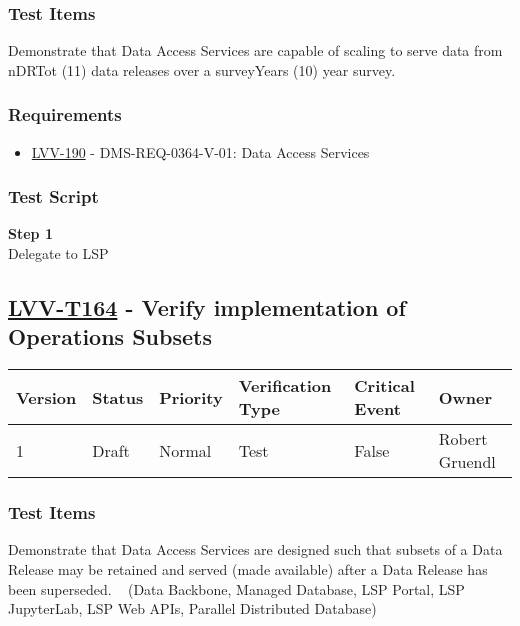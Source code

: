 \subsubsection{Test Items}\label{test-items-29}

Demonstrate that Data Access Services are capable of scaling to serve
data from nDRTot (11) data releases over a surveyYears (10) year survey.

\subsubsection{Requirements}\label{requirements-29}

\begin{itemize}
\tightlist
\item
  \href{https://jira.lsstcorp.org/browse/LVV-190}{LVV-190} -
  DMS-REQ-0364-V-01: Data Access Services
\end{itemize}

\subsubsection{Test Script}\label{test-script-29}

\textbf{Step 1}\\
Delegate to LSP\\[2\baselineskip]

\hypertarget{lvv-t164---verify-implementation-of-operations-subsets}{\subsection{\texorpdfstring{\href{https://jira.lsstcorp.org/secure/Tests.jspa\#/testCase/LVV-T164}{LVV-T164}
- Verify implementation of Operations
Subsets}{LVV-T164 - Verify implementation of Operations Subsets}}\label{lvv-t164---verify-implementation-of-operations-subsets}}

\begin{longtable}[]{@{}llllll@{}}
\toprule
Version & Status & Priority & Verification Type & Critical Event &
Owner\tabularnewline
\midrule
\endhead
1 & Draft & Normal & Test & False & Robert Gruendl\tabularnewline
\bottomrule
\end{longtable}

\subsubsection{Test Items}\label{test-items-30}

Demonstrate that Data Access Services are designed such that subsets of
a Data Release may be retained and served (made available) after a Data
Release has been superseded. ~ (Data Backbone, Managed Database, LSP
Portal, LSP JupyterLab, LSP Web APIs, Parallel Distributed Database)

